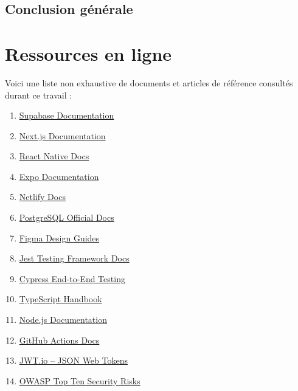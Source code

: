 \documentclass[12pt,a4paper]{report}
\begin{document}
\section*{Conclusion générale}


\chapter*{Ressources en ligne}
Voici une liste non exhaustive de documents et articles de référence consultés durant ce travail :

\begin{enumerate}[label=\arabic*., leftmargin=*]
  \item \href{https://supabase.com/docs}{Supabase Documentation}\label{res:supabase}
  \item \href{https://nextjs.org/docs}{Next.js Documentation}\label{res:nextjs}
  \item \href{https://reactnative.dev/docs/getting-started}{React Native Docs}\label{res:reactnative}
  \item \href{https://docs.expo.dev}{Expo Documentation}\label{res:expo}
  \item \href{https://docs.netlify.com}{Netlify Docs}\label{res:netlify}
  \item \href{https://www.postgresql.org/docs/}{PostgreSQL Official Docs}\label{res:postgresql}
  \item \href{https://figma.com/resources/learn-design}{Figma Design Guides}\label{res:figma}
  \item \href{https://jestjs.io/docs}{Jest Testing Framework Docs}\label{res:jest}
  \item \href{https://docs.cypress.io}{Cypress End-to-End Testing}\label{res:cypress}
  \item \href{https://www.typescriptlang.org/docs}{TypeScript Handbook}\label{res:typescript}
  \item \href{https://nodejs.org/en/docs}{Node.js Documentation}\label{res:node}
  \item \href{https://docs.github.com/en/actions}{GitHub Actions Docs}\label{res:githubactions}
  \item \href{https://jwt.io/introduction}{JWT.io – JSON Web Tokens}\label{res:jwt}
  \item \href{https://owasp.org/www-project-top-ten/}{OWASP Top Ten Security Risks}\label{res:owasp}

\end{enumerate}
\end{document}
